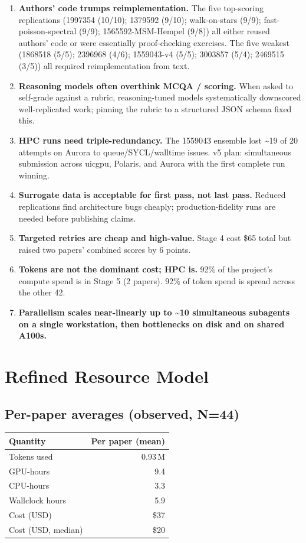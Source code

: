 \documentclass[11pt,letterpaper]{article}
\begin{document}
\begin{enumerate}
\item \textbf{Authors' code trumps reimplementation.} The five top-scoring replications (1997354 (10/10); 1379592 (9/10); walk-on-stars (9/9); fast-poisson-spectral (9/9); 1565592-MSM-Hempel (9/8)) all either reused authors' code or were essentially proof-checking exercises. The five weakest (1868518 (5/5); 2396968 (4/6); 1559043-v4 (5/5); 3003857 (5/4); 2469515 (3/5)) all required reimplementation from text.
\item \textbf{Reasoning models often overthink MCQA / scoring.} When asked to self-grade against a rubric, reasoning-tuned models systematically downscored well-replicated work; pinning the rubric to a structured JSON schema fixed this.
\item \textbf{HPC runs need triple-redundancy.} The 1559043 ensemble lost \textasciitilde{}19 of 20 attempts on Aurora to queue/SYCL/walltime issues. v5 plan: simultaneous submission across uicgpu, Polaris, and Aurora with the first complete run winning.
\item \textbf{Surrogate data is acceptable for first pass, not last pass.} Reduced replications find architecture bugs cheaply; production-fidelity runs are needed before publishing claims.
\item \textbf{Targeted retries are cheap and high-value.} Stage 4 cost \$65 total but raised two papers' combined scores by 6 points.
\item \textbf{Tokens are not the dominant cost; HPC is.} 92\% of the project's compute spend is in Stage 5 (2 papers). 92\% of token spend is spread across the other 42.
\item \textbf{Parallelism scales near-linearly up to \textasciitilde{}10 simultaneous subagents on a single workstation, then bottlenecks on disk and on shared A100s.}
\end{enumerate}

\section{Refined Resource Model}

\subsection{Per-paper averages (observed, N=44)}

\begin{tabular}{lr}
\toprule
\textbf{Quantity} & \textbf{Per paper (mean)} \\
\midrule
Tokens used & 0.93\,M \\
GPU-hours & 9.4 \\
CPU-hours & 3.3 \\
Wallclock hours & 5.9 \\
Cost (USD) & \$37 \\
Cost (USD, median) & \$20 \\
\bottomrule
\end{tabular}
\end{document}

